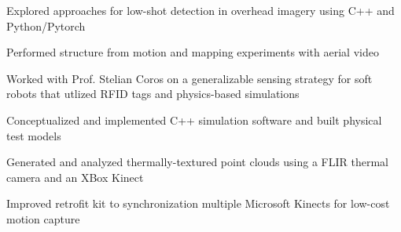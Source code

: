 \documentclass[]{deedy-resume-openfont}
\begin{document}
\sectionsep
{}
\hfill
{}
\begin{tightemize}
\item Explored approaches for low-shot detection in overhead imagery using C++ and Python/Pytorch
\item Performed structure from motion and mapping experiments with aerial video
\end{tightemize}
\sectionsep

\hfill
{}
\begin{tightemize}
\item Worked with Prof. Stelian Coros on a generalizable sensing strategy for soft robots that utlized RFID tags and physics-based simulations
\item Conceptualized and implemented C++ simulation software and built physical test models 

\end{tightemize}
\sectionsep

\hfill 
{}


\begin{tightemize}
\item Generated and analyzed thermally-textured point clouds using a FLIR thermal camera and an XBox Kinect 
\item Improved retrofit kit to synchronization multiple Microsoft Kinects for low-cost motion capture
\end{tightemize}
\sectionsep

\end{document}
